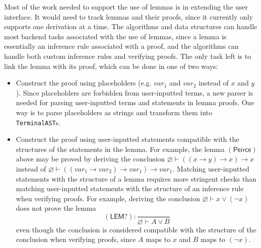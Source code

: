 Most of the work needed to support the use of lemmas is in extending the user interface. It would need to track lemmas and their proofs, since it currently only supports one derivation at a time. The algorithms and data structures can handle most backend tasks associated with the use of lemmas, since a lemma is essentially an inference rule associated with a proof, and the algorithms can handle both custom inference rules and verifying proofs. The only task left is to link the lemma with its proof, which can be done in one of two ways:
\begin{itemize}
    \item Construct the proof using placeholders (e.g. $var_1$ and $var_2$ instead of $x$ and $y$). Since placeholders are forbidden from user-inputted terms, a new parser is needed for parsing user-inputted terms and statements in lemma proofs. One way is to parse placeholders as strings and transform them into \lstinline{TerminalAST}s.
    \item Construct the proof using user-inputted statements compatible with the structures of the statements in the lemma. For example, the lemma $(\textsf{Peirce})$ above may be proved by deriving the conclusion $\varnothing \vdash ((x \to y) \to x) \to x$ instead of $\varnothing \vdash ((var_1 \to var_2) \to var_1) \to var_1$. Matching user-inputted statements with the structure of a lemma requires more stringent checks than matching user-inputted statements with the structure of an inference rule when verifying proofs. For example, deriving the conclusion $\varnothing \vdash x \lor (\lnot x)$ does not prove the lemma
    \[
        (\textsf{LEM?}): \frac{}{\varnothing \vdash A \lor B}
    \]
    even though the conclusion is considered compatible with the structure of the conclusion when verifying proofs, since $A$ maps to $x$ and $B$ maps to $(\lnot x)$.
\end{itemize}

